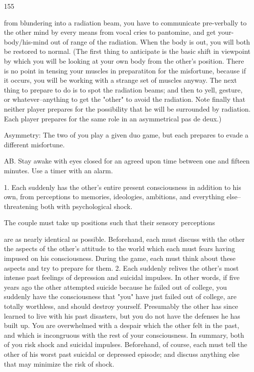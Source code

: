 \documentclass[10pt,twoside]{memoir}
\begin{document}
\begin{enumerate}
{\begin{enumerate}
\begin{sysrules}
\begin{sysrules}
\begin{sysrules}
\begin{sysrules}
155 


from blundering into a radiation beam, you have to communicate 
pre-verbally to the other mind by every means from vocal cries to 
pantomine, and get your-body/his-mind out of range of the radiation. When 
the body is out, you will both be restored to normal. (The first thing to 
anticipate is the basic shift in viewpoint by which you will be looking at 
your own body from the other's position. There is no point in tensing your 
muscles in preparatiton for the misfortune, because if it occurs, you will be 
working with a strange set of muscles anyway. The next thing to prepare to 
do is to spot the radiation beams; and then to yell, gesture, or 
whatever--anything to get the "other" to avoid the radiation. Note finally 
that neither player prepares for the possibility that he will be surrounded by 
radiation. Each player prepares for the same role in an asymmetrical pas de 
deux.) 

Asymmetry: The two of you play a given duo game, but each prepares 
to evade a different misfortune. 

AB. Stay awake with eyes closed for an agreed upon time between one 
and fifteen minutes. Use a timer with an alarm. 

1. Each suddenly has the other's entire present consciousness in addition to 
his own, from perceptions to memories, ideologies, ambitions, and 
everything else--threatening both with psychological shock. 

The couple must take up positions such that their sensory perceptions 

are as nearly identical as possible. Beforehand, each must discuss with the 
other the aspects of the other's attitude to the world which each must fears 
having impused on his consciousness. During the game, each must think 
about these aspects and try to prepare for them. 
2. Each suddenly relives the other's most intense past feelings of depression 
and suicidal impulses. In other words, if five years ago the other attempted 
suicide because he failed out of college, you suddenly have the consciousness 
that "you" have just failed out of college, are totally worthless, and should 
destroy yourself. Presumably the other has since learned to live with his past 
disasters, but you do not have the defenses he has built up. You are 
overwhelmed with a despair which the other felt in the past, and which is 
incongruous with the rest of your consciousness. In summary, both of you 
risk shock and suicidal impulses. Beforehand, of course, each must tell the 
other of his worst past suicidal or depressed episode; and discuss anything 
else that may minimize the risk of shock. 



\end{sysrules}
\end{sysrules}
\end{sysrules}
\end{sysrules}
\end{enumerate}}
\end{enumerate}
\end{document}
